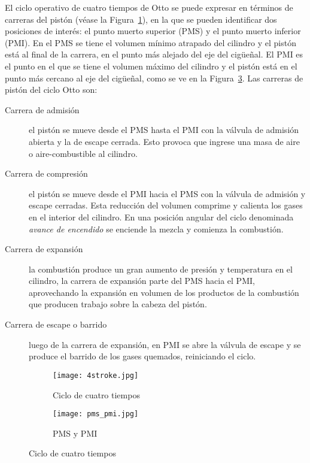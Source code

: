 El ciclo operativo de cuatro tiempos de Otto se puede expresar en términos de
carreras del pistón (véase la Figura~\ref{fig:4tiempos}), en la que se pueden
identificar dos posiciones de interés: el punto muerto superior (PMS) y el punto
muerto inferior (PMI).
%
En el PMS se tiene el volumen mínimo atrapado del cilindro y el pistón está al
final de la carrera, en el punto más alejado del eje del cigüeñal.
%
El PMI es el punto en el que se tiene el volumen máximo del cilindro y el pistón
está en el punto más cercano al eje del cigüeñal, como se ve en la
Figura~\ref{fig:pms_pmi}.
%
Las carreras de pistón del ciclo Otto son:
%
\begin{description}
%
    \item [Carrera de admisión] el pistón se mueve desde el PMS hasta el PMI con
        la válvula de admisión abierta y la de escape cerrada.
        Esto provoca que ingrese una masa de aire o aire-combustible al cilindro.
%
    \item [Carrera de compresión] el pistón se mueve desde el PMI hacia el PMS
        con la válvula de admisión y escape cerradas.
        Esta reducción del volumen comprime y calienta los gases en el interior
del cilindro.
        En una posición angular del ciclo denominada \emph{avance de encendido}
se enciende la mezcla y comienza la combustión.
%
    \item [Carrera de expansión] la combustión produce un gran
aumento de presión y temperatura en el cilindro, la carrera de expansión parte
del PMS hacia el PMI, aprovechando la expansión en volumen de los productos de
la combustión que producen trabajo sobre la cabeza del pistón.
%
    \item [Carrera de escape o barrido] luego de la carrera de expansión, en PMI
se abre la válvula de escape y se produce el  barrido de los gases quemados,
reiniciando el ciclo.
%
\end{description}

\begin{figure}
  \centering
  \begin{subfigure}{0.6\textwidth}
    \centering
    \texttt{[image: 4stroke.jpg]}
    \caption{Ciclo de cuatro tiempos}\label{fig:4tiempos} %
  \end{subfigure}%
  \begin{subfigure}{0.4\textwidth}
    \centering
    \texttt{[image: pms\_pmi.jpg]}
    \caption{PMS y PMI}\label{fig:pms_pmi}
  \end{subfigure}
  \caption{Ciclo de cuatro tiempos}
\end{figure}


